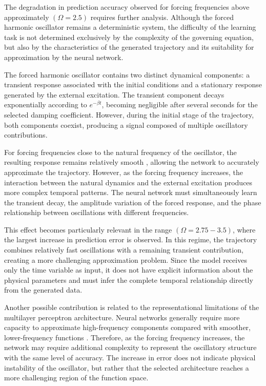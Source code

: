 The degradation in prediction accuracy observed for forcing frequencies above approximately $(\Omega=2.5)$ requires further analysis. Although the forced harmonic oscillator remains a deterministic system, the difficulty of the learning task is not determined exclusively by the complexity of the governing equation, but also by the characteristics of the generated trajectory and its suitability for approximation by the neural network.

The forced harmonic oscillator contains two distinct dynamical components: a transient response associated with the initial conditions and a stationary response \cite{landau1986mechanics} generated by the external excitation. The transient component decays exponentially according to $e^{-\beta t}$, becoming negligible after several seconds for the selected damping coefficient. However, during the initial stage of the trajectory, both components coexist, producing a signal composed of multiple oscillatory contributions.

For forcing frequencies close to the natural frequency of the oscillator, the resulting response remains relatively smooth \cite{taylor_classical_mechanics}, allowing the network to accurately approximate the trajectory. However, as the forcing frequency increases, the interaction between the natural dynamics and the external excitation produces more complex temporal patterns. The neural network must simultaneously learn the transient decay, the amplitude variation of the forced response, and the phase relationship between oscillations with different frequencies.

This effect becomes particularly relevant in the range $(\Omega=2.75-3.5)$, where the largest increase in prediction error is observed. In this regime, the trajectory combines relatively fast oscillations with a remaining transient contribution, creating a more challenging approximation problem. Since the model receives only the time variable as input, it does not have explicit information about the physical parameters and must infer the complete temporal relationship directly from the generated data.

Another possible contribution is related to the representational limitations of the multilayer perceptron architecture. Neural networks generally require more capacity to approximate high-frequency components compared with smoother, lower-frequency functions \cite{rahaman2019spectral}. Therefore, as the forcing frequency increases, the network may require additional complexity to represent the oscillatory structure with the same level of accuracy. The increase in error does not indicate physical instability of the oscillator, but rather that the selected architecture reaches a more challenging region of the function space.

